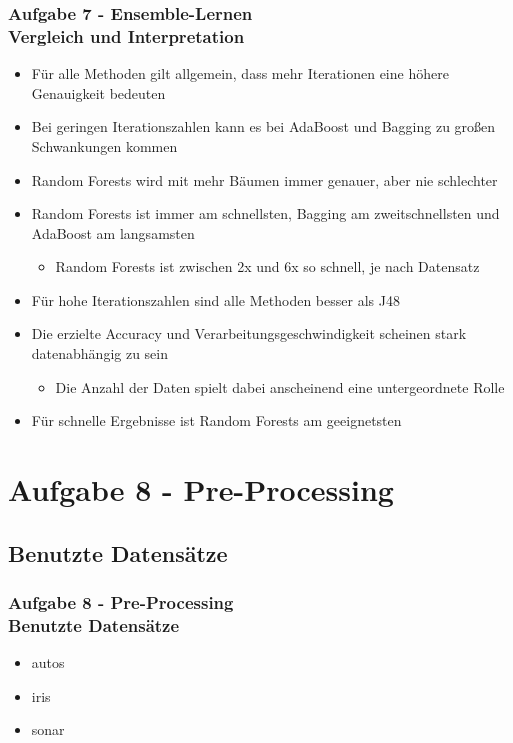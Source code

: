 \documentclass[accentcolor=tud10b,colorbacktitle,inverttitle,landscape,german,presentation,t]{tudbeamer}
\begin{document}
    \begin{frame}[t]
    \frametitle{Aufgabe 7 - Ensemble-Lernen\\ Vergleich und Interpretation}
		\begin{itemize}
			\item Für alle Methoden gilt allgemein, dass mehr Iterationen eine höhere Genauigkeit bedeuten
			\item Bei geringen Iterationszahlen kann es bei AdaBoost und Bagging zu großen Schwankungen kommen
			\item Random Forests wird mit mehr Bäumen immer genauer, aber nie schlechter
			\item Random Forests ist immer am schnellsten, Bagging am zweitschnellsten und AdaBoost am langsamsten
			\begin{itemize}
				\item Random Forests ist zwischen 2x und 6x so schnell, je nach Datensatz
			\end{itemize}
			\item Für hohe Iterationszahlen sind alle Methoden besser als J48
			\item Die erzielte Accuracy und Verarbeitungsgeschwindigkeit scheinen stark datenabhängig zu sein
			\begin{itemize}
				\item Die Anzahl der Daten spielt dabei anscheinend eine untergeordnete Rolle
			\end{itemize}			
			\item Für schnelle Ergebnisse ist Random Forests am geeignetsten
		\end{itemize}
    \end{frame}
    
    \section{Aufgabe 8 - Pre-Processing}
    
    \subsection{Benutzte Datensätze}
    
    \begin{frame}[t]
    \frametitle{Aufgabe 8 - Pre-Processing\\ Benutzte Datensätze}
        \begin{itemize}
            \item autos
            \item iris
            \item sonar
        \end{itemize}
    \end{frame}
    
\end{document}
